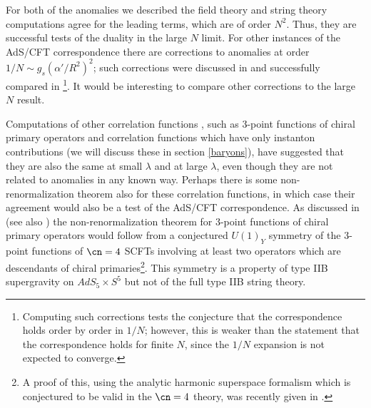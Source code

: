 For both of the anomalies we described the field theory and string
theory computations agree for the leading terms, which are of order
$N^2$. Thus, they are successful tests of the duality in the large $N$
limit. 
For other instances of the AdS/CFT correspondence there are
corrections to anomalies at order $1/N \sim g_s (\alpha'/R^2)^2$;
such corrections were discussed in \cite{Anselmi:1998zb} and
successfully compared in 
\cite{Aharony:1999rz,Blau:1999vz,Nojiri:1999mh}\footnote{Computing
such corrections tests the conjecture that the correspondence holds
order by order in $1/N$; however, this is weaker than the statement
that the correspondence holds for finite $N$, since the $1/N$
expansion is not expected to converge.}.
It would be interesting to compare other corrections to the large $N$
result.

Computations of other correlation functions 
\cite{Lee:1998bx,D'Hoker:1999tz,Gonzalez-Rey:1999ih}, 
such as 3-point
functions of chiral primary operators and correlation functions which
have only instanton contributions (we will discuss these in section
\ref{baryons}), have suggested that they are
also the same at small $\lambda$ and at large $\lambda$, even though
they are not related to anomalies in any known way. Perhaps there is
some non-renormalization theorem also for these correlation functions,
in which case their agreement would also be a test of the AdS/CFT
correspondence. 
As discussed in \cite{Intriligator:1998ig,
Intriligator:1999ff} (see also \cite{Ferrara:1998zt})
the non-renormalization theorem for 3-point
functions of chiral primary operators would follow from a conjectured
$U(1)_Y$ symmetry of the 3-point functions of $\cn=4$ SCFTs involving
at least two operators which are descendants of chiral 
primaries\footnote{A proof of this, using the analytic harmonic superspace
formalism which is conjectured to be valid in the $\cn=4$ theory,
was recently given in \cite{Eden:1999}.}. This
symmetry is a property of type IIB supergravity on $AdS_5\times S^5$
but not of the full type IIB string theory.


